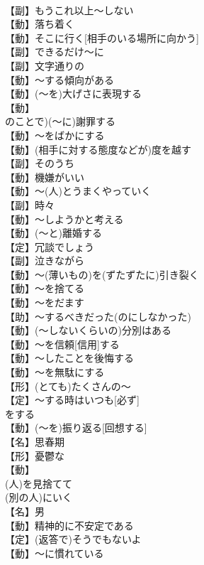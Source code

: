\documentclass[8pt]{extreport}
\begin{document}
\begin{CJK}{UTF8}{min}
\\	【副】もうこれ以上～しない
\\	【動】落ち着く
\\	【動】そこに行く[相手のいる場所に向かう]
\\	【副】できるだけ～に
\\	【副】文字通りの
\\	【動】～する傾向がある
\\	【動】(～を)大げさに表現する
\\	【動】
\\	のことで)(～に)謝罪する
\\	【動】～をばかにする
\\	【動】(相手に対する態度などが)度を越す
\\	【副】そのうち
\\	【動】機嫌がいい
\\	【動】～(人)とうまくやっていく
\\	【副】時々
\\	【動】～しようかと考える
\\	【動】(～と)離婚する
\\	【定】冗談でしょう
\\	【副】泣きながら
\\	【動】～(薄いもの)を(ずたずたに)引き裂く
\\	【動】～を捨てる
\\	【動】～をだます
\\	【助】～するべきだった(のにしなかった)
\\	【動】(～しないくらいの)分別はある
\\	【動】～を信頼[信用]する
\\	【動】～したことを後悔する
\\	【動】～を無駄にする
\\	【形】(とても)たくさんの～
\\	【定】～する時はいつも[必ず]
\\	をする
\\	【動】(～を)振り返る[回想する]
\\	【名】思春期
\\	【形】憂鬱な
\\	【動】
\\	(人)を見捨てて
\\	(別の人)にいく
\\	【名】男
\\	【動】精神的に不安定である
\\	【定】(返答で)そうでもないよ
\\	【動】～に慣れている

\end{CJK}
\end{document}
